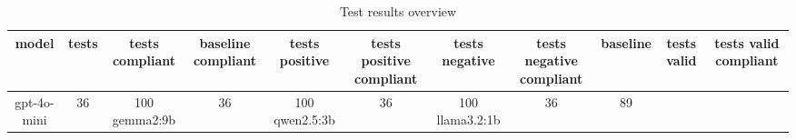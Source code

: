 
  \begin{table}[h!]
  \centering
  \begin{tabular}{|c|c|c|c|c|c|c|c|c|c|c|}
  \hline
  model & tests & tests compliant & baseline compliant & tests positive & tests positive compliant & tests negative & tests negative compliant & baseline & tests valid & tests valid compliant \\
  \hline
  gpt-4o-mini & 36 & 100%
\hline
gemma2:9b & 36 & 100%
\hline
qwen2.5:3b & 36 & 100%
\hline
llama3.2:1b & 36 & 89%
  \end{tabular}
  \caption{Test results overview}
  
  \end{table}
  